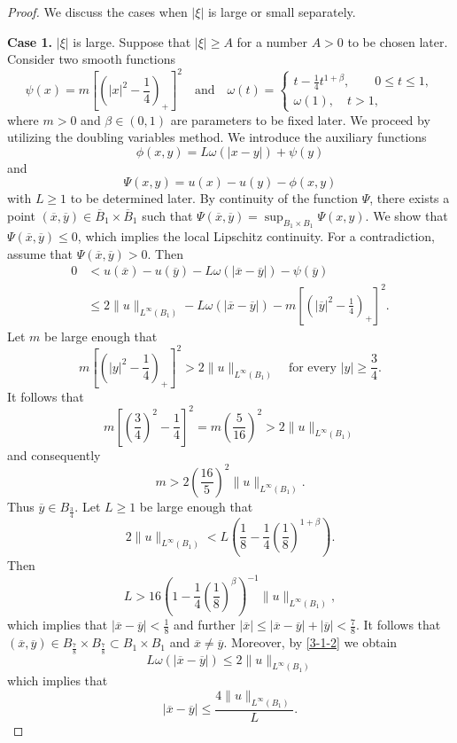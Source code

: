 \documentclass[11pt,reqno]{amsart}
\numberwithin{equation}{section}
\begin{document}
\begin{proof}
We discuss the cases when $|\xi|$ is large or small separately.

\textbf{Case 1.} $|\xi|$ is large. Suppose that $|\xi|\ge A$ for a number $A>0$ to be chosen later. Consider two smooth functions
\begin{equation}
\label{3-1-1}
\psi(x)=m\left[\left(|x|^2-\frac{1}{4}\right)_+\right]^2 \quad\text{and}\quad \omega(t)=\begin{cases}t-\frac{1}{4}t^{1+\beta},\qquad0\le t\le1,\\
\omega(1),\quad t>1,
\end{cases}
\end{equation}
where $m>0$ and $\beta\in(0,1)$ are parameters to be fixed later. We proceed by utilizing the doubling variables method.
We introduce the auxiliary functions
$$
\phi(x,y)=L\omega(|x-y|)+\psi(y)
$$
and
$$
\Psi(x,y)=u(x)-u(y)-\phi(x,y)
$$
with $L\ge1$ to be determined later. By continuity of the function $\Psi$, there exists a point   $(\overline{x},\overline{y})\in \overline{B}_1\times\overline{B}_1$ such that $\Psi(\overline{x},\overline{y})=\sup_{B_1\times B_1}\Psi(x,y)$. We show that $\Psi(\overline{x},\overline{y})\le0$, which implies the local Lipschitz continuity.
For a contradiction, assume that  $\Psi(\overline{x},\overline{y})>0$. Then
\begin{equation}
\label{3-1-2}
\begin{split}
0&<u(\overline{x})-u(\overline{y})-L\omega(|\overline{x}-\overline{y}|)-\psi(\overline{y}) \\
&\le2\|u\|_{L^\infty(B_1)}-L\omega(|\overline{x}-\overline{y}|)-m\left[\left(|\overline{y}|^2-\frac{1}{4}\right)_+\right]^2.
\end{split}
\end{equation}
Let $m$ be large enough that
$$
m\left[\left(|y|^2-\frac{1}{4}\right)_+\right]^2>2\|u\|_{L^\infty(B_1)} \quad\text{for every } |y|\ge\frac{3}{4}.
$$
It follows that
$$
m\left[\left(\frac{3}{4}\right)^2-\frac{1}{4}\right]^2=m\left(\frac{5}{16}\right)^2>2\|u\|_{L^\infty(B_1)}
$$
and consequently
$$
m>2\left(\frac{16}{5}\right)^2\|u\|_{L^\infty(B_1)}.
 $$
Thus $\overline{y}\in B_{\frac34}$. Let $L\ge1$ be large enough that
$$
2\|u\|_{L^\infty(B_1)}<L\left(\frac{1}{8}-\frac{1}{4}\left(\frac{1}{8}\right)^{1+\beta}\right).
$$
Then
$$
L>16\left(1-\frac{1}{4}\left(\frac{1}{8}\right)^\beta\right)^{-1}\|u\|_{L^\infty(B_1)},
$$
which implies that $|\overline{x}-\overline{y}|<\frac{1}{8}$
and further $|\overline{x}|\le |\overline{x}-\overline{y}|+|\overline{y}|<\frac{7}{8}$.
It follows that $(\overline{x},\overline{y})\in B_\frac{7}{8}\times B_\frac{7}{8}\subset B_1\times B_1$ and $\overline{x}\neq\overline{y}$.
Moreover, by \eqref{3-1-2} we obtain
$$
L\omega(|\overline{x}-\overline{y}|)\le2\|u\|_{L^\infty(B_1)}
$$
which implies that
$$
 |\overline{x}-\overline{y}|\le\frac{4\|u\|_{L^\infty(B_1)}}{L}.
$$


\end{proof}
\end{document}
